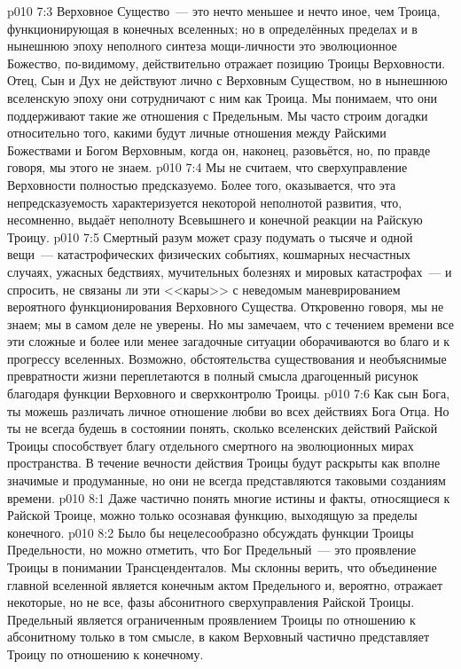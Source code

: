 \vs p010 7:3 Верховное Существо~--- это нечто меньшее и нечто иное, чем Троица, функционирующая в конечных вселенных; но в определённых пределах и в нынешнюю эпоху неполного синтеза мощи\hyp{}личности это эволюционное Божество, по\hyp{}видимому, действительно отражает позицию Троицы Верховности. Отец, Сын и Дух не действуют лично с Верховным Существом, но в нынешнюю вселенскую эпоху они сотрудничают с ним как Троица. Мы понимаем, что они поддерживают такие же отношения с Предельным. Мы часто строим догадки относительно того, какими будут личные отношения между Райскими Божествами и Богом Верховным, когда он, наконец, разовьётся, но, по правде говоря, мы этого не знаем.
\vs p010 7:4 \pc Мы не считаем, что сверхуправление Верховности полностью предсказуемо. Более того, оказывается, что эта непредсказуемость характеризуется некоторой неполнотой развития, что, несомненно, выдаёт неполноту Всевышнего и конечной реакции на Райскую Троицу.
\vs p010 7:5 Смертный разум может сразу подумать о тысяче и одной вещи~--- катастрофических физических событиях, кошмарных несчастных случаях, ужасных бедствиях, мучительных болезнях и мировых катастрофах~--- и спросить, не связаны ли эти <<кары>> с неведомым маневрированием вероятного функционирования Верховного Существа. Откровенно говоря, мы не знаем; мы в самом деле не уверены. Но мы замечаем, что с течением времени все эти сложные и более или менее загадочные ситуации  оборачиваются во благо и к прогрессу вселенных. Возможно, обстоятельства существования и необъяснимые превратности жизни переплетаются в полный смысла драгоценный рисунок благодаря функции Верховного и сверхконтролю Троицы.
\vs p010 7:6 Как сын Бога, ты можешь различать личное отношение любви во всех действиях Бога Отца. Но ты не всегда будешь в состоянии понять, сколько вселенских действий Райской Троицы способствует благу отдельного смертного на эволюционных мирах пространства. В течение вечности действия Троицы будут раскрыты как вполне значимые и продуманные, но они не всегда представляются таковыми созданиям времени.
\vs p010 8:1 Даже частично понять многие истины и факты, относящиеся к Райской Троице, можно только осознавая функцию, выходящую за пределы конечного.
\vs p010 8:2 Было бы нецелесообразно обсуждать функции Троицы Предельности, но можно отметить, что Бог Предельный~--- это проявление Троицы в понимании Трансценденталов. Мы склонны верить, что объединение главной вселенной является конечным актом Предельного и, вероятно, отражает некоторые, но не все, фазы абсонитного сверхуправления Райской Троицы. Предельный является ограниченным проявлением Троицы по отношению к абсонитному только в том смысле, в каком Верховный частично представляет Троицу по отношению к конечному.
